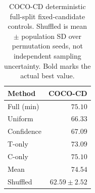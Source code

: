 \begin{table}[t]
\caption{COCO-CD deterministic full-split fixed-candidate controls. Shuffled is mean $\pm$ population SD over permutation seeds, not independent sampling uncertainty. Bold marks the actual best value.}
\label{tab:cd-mechanism}
\centering\small
\begin{tabular}{@{}lr@{}}
\toprule
Method & COCO-CD \\
\midrule
Full (min) & $\mathbf{75.10}$ \\
Uniform & $66.33$ \\
Confidence & $67.09$ \\
T-only & $73.09$ \\
C-only & $75.10$ \\
Mean & $74.54$ \\
Shuffled & $62.59\pm2.52$ \\
\bottomrule
\end{tabular}
\end{table}
